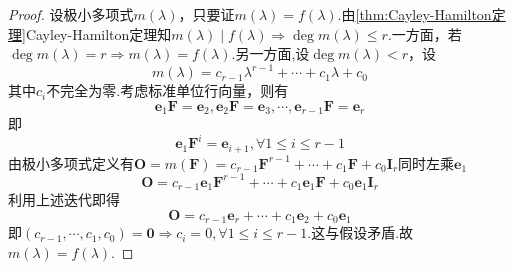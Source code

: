 {\begin{proof}
        设极小多项式$m\left(\lambda\right)$，只要证$m\left(\lambda\right)=f\left(\lambda\right)$.由\cref{thm:Cayley-Hamilton定理}Cayley-Hamilton定理知$m\left(\lambda\right)\mid f\left(\lambda\right)\Longrightarrow
            \deg m\left(\lambda\right)\leqslant r.$一方面，若$\deg m\left(\lambda\right)=r\Longrightarrow m\left(\lambda\right)=f\left(\lambda\right).$另一方面,设$\deg m\left(\lambda\right)<r$，设\[
            m\left(\lambda\right)=c_{r-1}\lambda^{r-1}+\cdots+c_1\lambda+c_0
        \]其中$c_i$不完全为零.考虑标准单位行向量，则有
        \[
            \bm{e}_1\bm{F}=\bm{e}_2,\bm{e}_2\bm{F}=\bm{e}_3,\cdots,\bm{e}_{r-1}\bm{F}=\bm{e}_r
        \]即\[
            \bm{e}_1\bm{F}^i=\bm{e}_{i+1},\forall 1\leqslant i\leqslant r-1
        \]由极小多项式定义有$\bm{O}=m\left(\bm{F}\right)=
            c_{r-1}\bm{F}^{r-1}+\cdots+c_1\bm{F}+c_0\bm{I}_r
        $同时左乘$\bm{e}_1$
        \[
            \bm{O}=c_{r-1}\bm{e}_1\bm{F}^{r-1}+\cdots+c_1\bm{e}_1\bm{F}+c_0\bm{e}_1\bm{I}_r
        \]利用上述迭代即得
        \[
            \bm{O}=c_{r-1}\bm{e}_r+\cdots+c_1\bm{e}_2+c_0\bm{e}_1
        \]即$\left(
            c_{r-1},\cdots,c_1,c_0
            \right)=\bm{0}\Longrightarrow
            c_i=0,\forall 1\leqslant i\leqslant r-1
        $.这与假设矛盾.故$m\left(\lambda\right)=f\left(\lambda\right)$.
    \end{proof}
}
